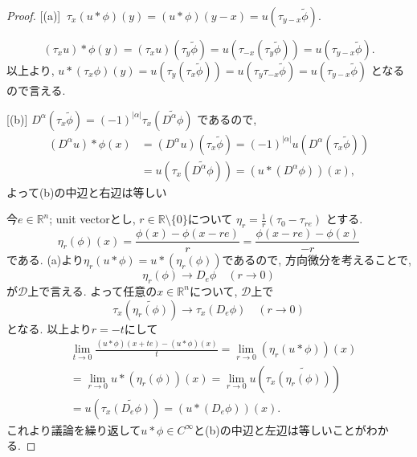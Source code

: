 \begin{proof}

[(a)] \(\ \tau_x(u \ast \phi)(y) = (u \ast \phi)(y-x) = u(\tau_{y-x} \widetilde{\phi})\).

\[
(\tau_x u) \ast \phi (y) = (\tau_x u)(\tau_y \widetilde{\phi}) = u(\tau_{-x}(\tau_y \widetilde{\phi})) 
= u(\tau_{y-x} \widetilde{\phi}).
\]
以上より, \(u \ast (\tau_x \phi)(y) = u(\tau_y (\tau_x \widetilde{\phi})) = u(\tau_y \tau_{-x} \widetilde{\phi}) = u(\tau_{y-x} \widetilde{\phi})\)  となるので言える. 

[(b)]
\(D^\alpha (\tau_x \widetilde{\phi}) = (-1)^{|\alpha|} \tau_x (\widetilde{D^\alpha \phi})\) 
であるので, 
\begin{align*}
(D^\alpha u) \ast \phi (x) 
&= (D^\alpha u)(\tau_x \widetilde{\phi}) 
= (-1)^{|\alpha|} u(D^\alpha (\tau_x \widetilde{\phi})) \\
&= u(\tau_x (\widetilde{D^\alpha \phi})) = (u \ast (D^\alpha \phi))(x),
\end{align*}
よって(b)の中辺と右辺は等しい

今\(e \in \mathbb{R}^n\); unit vectorとし,  \(r \in \mathbb{R} \setminus \{ 0\}\)について
 $
 \eta_r = \frac{1}{r} (\tau_0 - \tau_{re})
 $
 とする.  %
 \[\eta_r(\phi)(x) = \frac{\phi(x) - \phi(x-re)}{r}
 = \frac{\phi(x - re) - \phi(x)}{-r}
 \]
である.
(a)より\(\eta_r(u \ast \phi) = u \ast (\eta_r(\phi)) \)であるので, 
方向微分を考えることで, 
\[\eta_r(\phi) \to D_e \phi \quad (r \to 0)\]
が\(\mathcal{D}\)上で言える. 
よって任意の\(x \in \mathbb{R}^n\)について, \(\mathcal{D}\)上で
\[ \tau_x (\widetilde{\eta_r(\phi)}) \to \tau_x (D_e \phi) \quad (r \to 0) \]
となる. 
以上より$r=-t$にして
\begin{align*}
 &\lim_{t \to 0} \frac{(u \ast \phi)(x+te) - (u \ast \phi)(x)}{t}
= \lim_{r \to 0} (\eta_{r}(u \ast \phi))(x)\\
&= \lim_{r \to 0} u \ast (\eta_r(\phi))(x) 
= \lim_{r \to 0} u(\tau_x \widetilde{(\eta_r(\phi))}) \\
&= u(\tau_x \widetilde{(D_e \phi)})
= (u \ast (D_e \phi))(x).
\end{align*}
これより議論を繰り返して\(u \ast \phi \in C^\infty\)と(b)の中辺と左辺は等しいことがわかる.


\end{proof}
